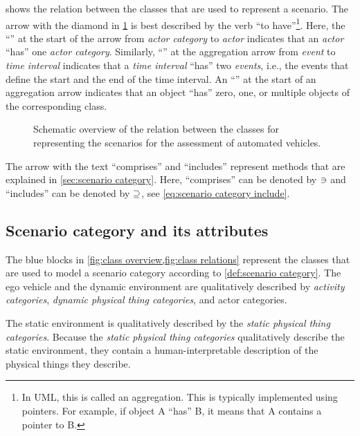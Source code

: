 \cstartb {} shows the relation between the classes that are used to represent a scenario. \cendb
The arrow with the diamond in \cref{fig:class relations} is best described by the verb ``to have''\footnote{In UML, this is called an aggregation. This is typically implemented using pointers. For example, if object A ``has'' B, it means that A contains a pointer to B.}. 
\cstartb Here, the ``\hasone'' at the start of the arrow from \textit{actor category} to \textit{actor} indicates that an \textit{actor} ``has'' one \textit{actor category}. Similarly, ``\hastwo'' at the aggregation arrow from \textit{event} to \textit{time interval} indicates that a \textit{time interval} ``has'' two \textit{events}, i.e., the events that define the start and the end of the time interval. \cendb 
An ``\hasn'' at the start of an aggregation arrow indicates that an object ``has'' zero, one, or multiple objects of the corresponding class.

\begin{figure}[t]
	\centering
	
	\caption{Schematic overview of the relation between the classes for representing the scenarios for the assessment of automated vehicles.}
	\label{fig:class relations}
\end{figure}

The arrow with the text ``comprises'' and ``includes'' represent methods that are explained in \cref{sec:scenario category}. Here, ``comprises'' can be denoted by $\ni$ and ``includes'' can be denoted by $\supseteq$, see \cref{eq:scenario category include}. 



\subsection{Scenario category and its attributes}
\label{sec:domain scenario category}

The blue blocks in \cref{fig:class overview,fig:class relations} represent the classes that are used to model a scenario category according to \cref{def:scenario category}.
The ego vehicle and the dynamic environment are qualitatively described by \textit{activity categories}, \cstartb\textit{dynamic physical thing categories}\cendb, and actor categories. 

The static environment is qualitatively described by \cstartc the \textit{static physical thing categories}. \cendc
Because the \cstartc\textit{static physical thing categories} \cendc qualitatively describe the static environment, they contain a human-interpretable description of the \cstartc physical things they describe\cendc.

